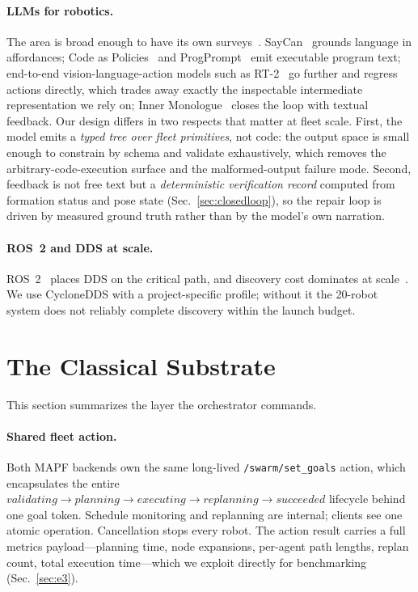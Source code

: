 \documentclass[10pt,twocolumn]{article}
\newcommand{\code}[1]{\texttt{\small #1}}
\begin{document}
\paragraph{LLMs for robotics.}
The area is broad enough to have its own surveys~\cite{llmrobsurvey}. SayCan~\cite{saycan}
grounds language in affordances; Code as
Policies~\cite{codeaspolicies} and ProgPrompt~\cite{progprompt} emit executable
program text; end-to-end vision-language-action models such as
RT-2~\cite{rt2} go further and regress actions directly, which trades away
exactly the inspectable intermediate representation we rely on; Inner
Monologue~\cite{innermonologue} closes the loop with
textual feedback. Our design differs in two respects that matter at fleet
scale. First, the model emits a \emph{typed tree over fleet primitives}, not
code: the output space is small enough to constrain by schema and validate
exhaustively, which removes the arbitrary-code-execution surface and the
malformed-output failure mode. Second, feedback is not free text but a
\emph{deterministic verification record} computed from formation status and
pose state (Sec.~\ref{sec:closedloop}), so the repair loop is driven by
measured ground truth rather than by the model's own narration.

\paragraph{ROS~2 and DDS at scale.}
ROS~2~\cite{ros2} places DDS on the critical path, and discovery cost dominates
at scale~\cite{dds1,dds2}. We use CycloneDDS with
a project-specific profile; without it the 20-robot system does not reliably
complete discovery within the launch budget.

\section{The Classical Substrate}
\label{sec:substrate}

This section summarizes the layer the orchestrator commands.

\paragraph{Shared fleet action.}
Both MAPF backends own the same long-lived \code{/swarm/set\_goals} action,
which encapsulates the entire
$\textit{validating} \rightarrow \textit{planning} \rightarrow
\textit{executing} \rightarrow \textit{replanning} \rightarrow
\textit{succeeded}$
lifecycle behind one goal token. Schedule monitoring and replanning are
internal; clients see one atomic operation. Cancellation stops every robot. The
action result carries a full metrics payload---planning time, node expansions,
per-agent path lengths, replan count, total execution time---which we exploit
directly for benchmarking (Sec.~\ref{sec:e3}).
\end{document}
